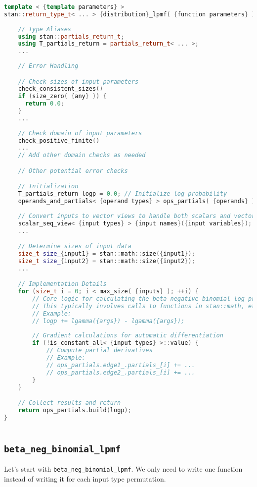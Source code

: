 \documentclass[11pt]{article}
\begin{document}
\begin{lstlisting}[language=c++, style=lgeneral]
template < {template parameters} > 
stan::return_type_t< ... > {distribution}_lpmf( {function parameters} ) { 
    
    // Type Aliases
    using stan::partials_return_t;
    using T_partials_return = partials_return_t< ... >;
    ...
    
    // Error Handling

    // Check sizes of input parameters
    check_consistent_sizes()
    if (size_zero( {any} )) {
      return 0.0;
    }
    ...
    
    // Check domain of input parameters
    check_positive_finite()
    ...
    // Add other domain checks as needed

    // Other potential error checks

    // Initialization
    T_partials_return logp = 0.0; // Initialize log probability
    operands_and_partials< {operand types} > ops_partials( {operands} ); // Initialize partial derivatives
    
    // Convert inputs to vector views to handle both scalars and vectors
    scalar_seq_view< {input types} > {input names}({input variables});
    ...

    // Determine sizes of input data
    size_t size_{input1} = stan::math::size({input1});
    size_t size_{input2} = stan::math::size({input2});
    ...

    // Implementation Details
    for (size_t i = 0; i < max_size( {inputs} ); ++i) {
        // Core logic for calculating the beta-negative binomial log probability
        // This typically involves calls to functions in stan::math, etc.
        // Example:
        // logp += lgamma({args}) - lgamma({args});
        
        // Gradient calculations for automatic differentiation
        if (!is_constant_all< {input types} >::value) {
            // Compute partial derivatives
            // Example:
            // ops_partials.edge1_.partials_[i] += ...
            // ops_partials.edge2_.partials_[i] += ...
        }
    }

    // Collect results and return
    return ops_partials.build(logp);
}
	
\end{lstlisting}





\cprotect\subsection{\verb|beta_neg_binomial_lpmf|}
Let's start with \verb|beta_neg_binomial_lpmf|. We only need to write one function instead of writing it for each input type permutation.
\end{document}
